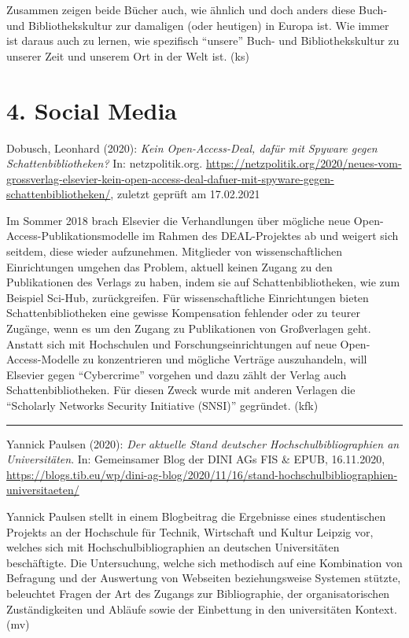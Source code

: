 \documentclass[a4paper,
fontsize=11pt,
oneside,
numbers=noperiodatend,
parskip=half-,
bibliography=totoc,
final
]{scrartcl}
\begin{document}
Zusammen zeigen beide Bücher auch, wie ähnlich und doch anders diese
Buch- und Bibliothekskultur zur damaligen (oder heutigen) in Europa ist.
Wie immer ist daraus auch zu lernen, wie spezifisch \enquote{unsere}
Buch- und Bibliothekskultur zu unserer Zeit und unserem Ort in der Welt
ist. (ks)

\hypertarget{social-media}{%
\section{4. Social Media}\label{social-media}}

Dobusch, Leonhard (2020): \emph{Kein Open-Access-Deal, dafür mit Spyware
gegen Schattenbibliotheken?} In: netzpolitik.org.
\url{https://netzpolitik.org/2020/neues-vom-grossverlag-elsevier-kein-open-access-deal-dafuer-mit-spyware-gegen-schattenbibliotheken/},
zuletzt geprüft am 17.02.2021

Im Sommer 2018 brach Elsevier die Verhandlungen über mögliche neue
Open-Access-Publika\-tionsmodelle im Rahmen des DEAL-Projektes ab und
weigert sich seitdem, diese wieder aufzunehmen. Mitglieder von
wissenschaftlichen Einrichtungen umgehen das Problem, aktuell keinen
Zugang zu den Publikationen des Verlags zu haben, indem sie auf
Schattenbibliotheken, wie zum Beispiel Sci-Hub, zurückgreifen. Für
wissenschaftliche Einrichtungen bieten Schattenbibliotheken eine gewisse
Kompensation fehlender oder zu teurer Zugänge, wenn es um den Zugang zu
Publikationen von Großverlagen geht. Anstatt sich mit Hochschulen und
Forschungseinrichtungen auf neue Open-Access-Modelle zu konzentrieren
und mögliche Verträge auszuhandeln, will Elsevier gegen
\enquote{Cybercrime} vorgehen und dazu zählt der Verlag auch
Schattenbibliotheken. Für diesen Zweck wurde mit anderen Verlagen die
\enquote{Scholarly Networks Security Initiative (SNSI)} gegründet. (kfk)

\begin{center}\rule{0.5\linewidth}{0.5pt}\end{center}

Yannick Paulsen (2020): \emph{Der aktuelle Stand deutscher
Hochschulbibliographien an Universitäten}. In: Gemeinsamer Blog der DINI
AGs FIS \& EPUB, 16.11.2020,
\url{https://blogs.tib.eu/wp/dini-ag-blog/2020/11/16/stand-hochschulbibliographien-universitaeten/}

Yannick Paulsen stellt in einem Blogbeitrag die Ergebnisse eines
studentischen Projekts an der Hochschule für Technik, Wirtschaft und
Kultur Leipzig vor, welches sich mit Hochschulbibliographien an
deutschen Universitäten beschäftigte. Die Untersuchung, welche sich
methodisch auf eine Kombination von Befragung und der Auswertung von
Webseiten beziehungsweise Systemen stützte, beleuchtet Fragen der Art
des Zugangs zur Bibliographie, der organisatorischen Zuständigkeiten und
Abläufe sowie der Einbettung in den universitäten Kontext. (mv)
\end{document}

